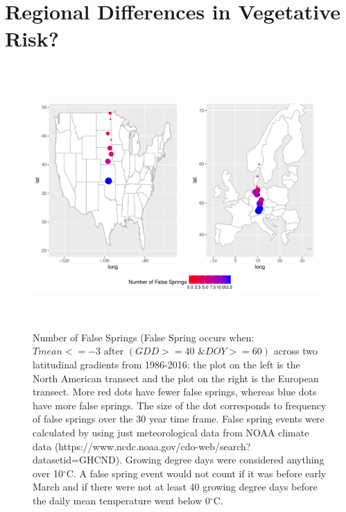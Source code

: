 \documentclass{article}\usepackage[]{graphicx}\usepackage[]{color}
\begin{document}
\renewcommand{\thetable}{\arabic{table}}
\renewcommand{\thefigure}{\arabic{figure}}
\renewcommand{\labelitemi}{$-$}

\section*{Regional Differences in Vegetative Risk?}

\begin{figure} [H]
\begin{center}
\caption{Number of False Springs (False Spring occurs when: \(Tmean <=-3 \text{ after } (GDD>=40 \text{ \& } DOY>=60) \) 
across two latitudinal gradients from 1986-2016: the plot on the left is the North American transect and the plot on the right is the European transect. More red dots have fewer false springs, whereas blue dots have more false springs. The size of the dot corresponds to frequency of false springs over the 30 year time frame. False spring events were calculated by using just meteorological data from NOAA climate data (https://www.ncdc.noaa.gov/cdo-web/search?datasetid=GHCND). Growing degree days were considered anything over 10$^{\circ}$C. A false spring event would not count if it was before early March \citep{Augspurger2013} and if there were not at least 40 growing degree days before the daily mean temperature went below 0$^{\circ}$C.}
\includegraphics[width=18cm, height=10cm]{..//figure/lat.pdf} %
\end{center}
\end{figure}
\end{document}
